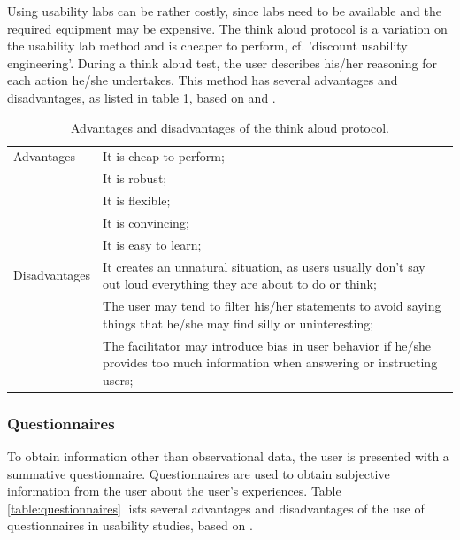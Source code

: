 Using usability labs can be rather costly, since labs need to be available and the required equipment may be expensive. The think aloud protocol is a variation on the usability lab method and is cheaper to perform, cf. 'discount usability engineering'\cite{duval:2012:chi:evaluation}. During a think aloud test, the user describes his/her reasoning for each action he/she undertakes\cite{nielsen:2012:nngroup:think_aloud}. This method has several advantages and disadvantages, as listed in table \ref{table:usability_engineering}, based on \cite{nielsen:2012:nngroup:think_aloud} and \cite{snyder:2003}.


\begin{table}%
	\begin{center}
		\begin{tabular}{l p{300px}}
			\hline
			Advantages		&		It is cheap to perform; \\
										&		It is robust; \\
										&		It is flexible; \\ %
										&		It is convincing; \\
										&		It is easy to learn; \\
			\hline
			Disadvantages	&		It creates an unnatural situation, as users usually don't say out loud everything they are about to do or think; \\
										&		The user may tend to filter his/her statements to avoid saying things that he/she may find silly or uninteresting; \\
										&		The facilitator may introduce bias in user behavior if he/she provides too much information when answering or instructing users; \\
			\hline
		\end{tabular}
	\end{center}
	\caption{Advantages and disadvantages of the think aloud protocol.}
	\label{table:usability_engineering}
\end{table}

\subsubsection{Questionnaires}

To obtain information other than observational data, the user is presented with a summative questionnaire. Questionnaires are used to obtain subjective information from the user about the user's experiences. Table \ref{table:questionnaires} lists several advantages and disadvantages of the use of questionnaires in usability studies, based on \cite{kirakowski:2013}.

